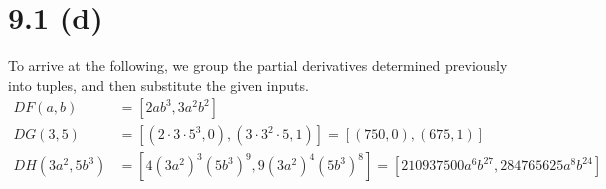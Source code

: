 \documentclass{article}
\begin{document}
\section*{9.1 (d)}

To arrive at the following, we group the partial derivatives
determined previously into tuples, and then substitute the given
inputs.
\begin{align*}
  DF(a, b) &= [2 a b^3, 3 a^2 b^2] \\
  DG(3, 5) &= [(2\cdot3\cdot5^3, 0), (3\cdot3^2\cdot5, 1)] = [(750, 0), (675, 1)] \\
  DH(3 a^2, 5 b^3) &= [4 (3 a^2)^3 (5 b^3)^9, 9 (3 a^2)^4 (5 b^3)^8] = [210937500 a^6 b^{27}, 284765625 a^8 b^{24}]
\end{align*}
\end{document}
